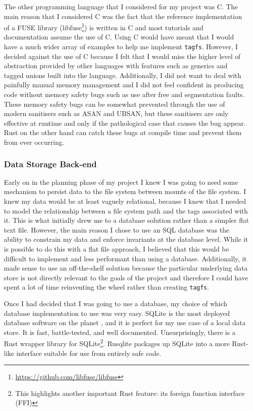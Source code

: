The other programming language that I considered for my project was C. The main
reason that I considered C was the fact that the reference implementation of a
FUSE library (libfuse\footnote{\url{https://github.com/libfuse/libfuse}}) is
written in C and most tutorials and documentation assume the use of C. Using C
would have meant that I would have a much wider array of examples to help me
implement \texttt{tagfs}. However, I decided against the use of C because I
felt that I would miss the higher level of abstraction provided by other
languages with features such as generics and tagged unions built into the
language. Additionally, I did not want to deal with painfully manual memory
management and I did not feel confident in producing code without memory
safety bugs such as use after free and segmentation faults. These memory safety
bugs can be somewhat prevented through the use of modern sanitisers such as
ASAN and UBSAN, but these sanitisers are only effective at runtime and only if
the pathological case that causes the bug appear. Rust on the other hand can
catch these bugs at compile time and prevent them from ever occurring.

\subsubsection{Data Storage Back-end}

Early on in the planning phase of my project I knew I was going to need some
mechanism to persist data to the file system between mounts of the file system.
I knew my data would be at least vaguely relational, because I knew that I
needed to model the relationship between a file system path and the tags
associated with it. This is what initially drew me to a database solution
rather than a simpler flat text file. However, the main reason I chose to use
an SQL database was the ability to constrain my data and enforce invariants at
the database level. While it is possible to do this with a flat file approach,
I believed that this would be difficult to implement and less performant than
using a database.
Additionally, it made sense to use an off-the-shelf solution because the
particular underlying data store is not directly relevant to the goals of the
project and therefore I could have spent a lot of time reinventing the wheel
rather than creating \texttt{tagfs}.

Once I had decided that I was going to use a database, my choice of which
database implementation to use was very easy. SQLite is the most deployed
database software on the planet \cite{sqlite-most-used}, and it is perfect for
my use case of a local data store. It is fast, battle-tested, and well
documented. Unsurprisingly, there is a Rust wrapper library for
SQLite\footnote{This highlights another important Rust feature: its foreign
function interface (FFI)}. Rusqlite packages up SQLite into a more Rust-like
interface suitable for use from entirely safe code.

